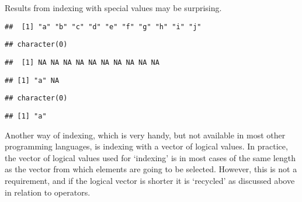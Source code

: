 \documentclass[paper=a4,10pt,div=17,headsepline,BCOR=12mm,twoside,open=right]{scrbook}\usepackage{knitr}
\begin{document}
Results from indexing with special values may be surprising.

\begin{knitrout}\footnotesize
{}\color{fgcolor}\begin{kframe}
\begin{alltt}
\end{alltt}
\begin{verbatim}
##  [1] "a" "b" "c" "d" "e" "f" "g" "h" "i" "j"
\end{verbatim}
\begin{alltt}
\hlstd{a[}\hlstd{(}\hlstd{)]}
\end{alltt}
\begin{verbatim}
## character(0)
\end{verbatim}
\begin{alltt}
\hlstd{a[}\hlstd{]}
\end{alltt}
\begin{verbatim}
##  [1] NA NA NA NA NA NA NA NA NA NA
\end{verbatim}
\begin{alltt}
\hlstd{a[}\hlstd{(}\hlstd{,} \hlstd{)]}
\end{alltt}
\begin{verbatim}
## [1] "a" NA
\end{verbatim}
\begin{alltt}
\hlstd{a[}\hlstd{]}
\end{alltt}
\begin{verbatim}
## character(0)
\end{verbatim}
\begin{alltt}
\hlstd{a[}\hlstd{(}\hlstd{,} \hlstd{)]}
\end{alltt}
\begin{verbatim}
## [1] "a"
\end{verbatim}
\end{kframe}
\end{knitrout}

Another way of indexing, which is very handy, but not available in most other programming languages, is indexing with a vector of logical values. In practice, the vector of logical values used for `indexing' is in most cases of the same length as the vector from which elements are going to be selected. However, this is not a requirement, and if the logical vector is shorter it is `recycled' as discussed above in relation to operators.
\end{document}
